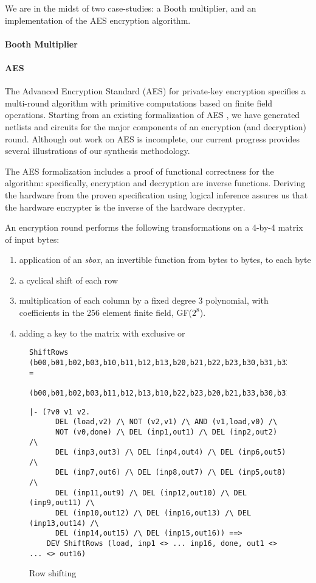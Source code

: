 We are in the midst of two case-studies: a Booth multiplier, and an implementation
of the AES encryption algorithm.

\paragraph{Booth Multiplier}
\paragraph{AES}

The Advanced Encryption Standard (AES) \cite{AES} for private-key encryption
specifies a multi-round algorithm with primitive computations based on finite
field operations.  Starting from an existing formalization of AES
\cite{slind:aes}, we have generated netlists and circuits for the major
components of an encryption (and decryption) round.  Although out work on AES
is incomplete, our current progress provides several illustrations of our
synthesis methodology.

The AES formalization includes a proof of functional correctness  for the
algorithm: specifically, encryption and decryption are inverse functions.
Deriving the hardware from the proven specification using logical inference
assures us that the hardware encrypter is the inverse of the hardware
decrypter.

An encryption round performs the following transformations on a 4-by-4 matrix
of input bytes:
\begin{enumerate}
\item
application of an \emph{sbox}, an invertible function from bytes to bytes,
to each byte
\item
a cyclical shift of each row
\item
multiplication of each column by a fixed degree 3 polynomial, with coefficients
in the 256 element finite field, GF($2^8$).
\item
adding a key to the matrix with exclusive or
\end{enumerate}

\begin{figure}
\begin{verbatim}
ShiftRows (b00,b01,b02,b03,b10,b11,b12,b13,b20,b21,b22,b23,b30,b31,b32,b33) =
          (b00,b01,b02,b03,b11,b12,b13,b10,b22,b23,b20,b21,b33,b30,b31,b32)
\end{verbatim}
\begin{verbatim}
|- (?v0 v1 v2.
      DEL (load,v2) /\ NOT (v2,v1) /\ AND (v1,load,v0) /\
      NOT (v0,done) /\ DEL (inp1,out1) /\ DEL (inp2,out2) /\
      DEL (inp3,out3) /\ DEL (inp4,out4) /\ DEL (inp6,out5) /\
      DEL (inp7,out6) /\ DEL (inp8,out7) /\ DEL (inp5,out8) /\
      DEL (inp11,out9) /\ DEL (inp12,out10) /\ DEL (inp9,out11) /\
      DEL (inp10,out12) /\ DEL (inp16,out13) /\ DEL (inp13,out14) /\
      DEL (inp14,out15) /\ DEL (inp15,out16)) ==>
    DEV ShiftRows (load, inp1 <> ... inp16, done, out1 <> ... <> out16) 
\end{verbatim}
\caption{Row shifting}
\label{AES:shift}
\end{figure}

